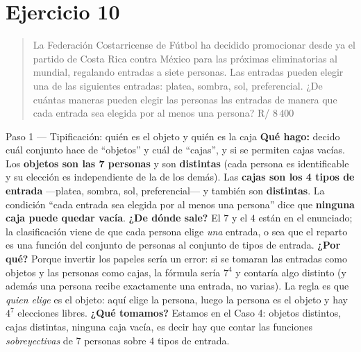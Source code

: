 \documentclass[11pt]{article}
\begin{document}
\section*{Ejercicio 10}

\begin{quote}
La Federación Costarricense de Fútbol ha decidido promocionar desde ya el partido de Costa Rica contra México para las próximas eliminatorias al mundial, regalando entradas a siete personas. Las entradas pueden elegir una de las siguientes entradas: platea, sombra, sol, preferencial. ¿De cuántas maneras pueden elegir las personas las entradas de manera que cada entrada sea elegida por al menos una persona? \hfill R/ $8\,400$
\end{quote}

\begin{paso}{Paso 1 --- Tipificación: quién es el objeto y quién es la caja}
\textbf{Qué hago:} decido cuál conjunto hace de ``objetos'' y cuál de ``cajas'', y si se permiten cajas vacías.
Los \textbf{objetos son las 7 personas} y son \textbf{distintas} (cada persona es identificable y su elección es independiente de la de los demás). Las \textbf{cajas son los 4 tipos de entrada} —platea, sombra, sol, preferencial— y también son \textbf{distintas}. La condición ``cada entrada sea elegida por al menos una persona'' dice que \textbf{ninguna caja puede quedar vacía}.
\textbf{¿De dónde sale?} El $7$ y el $4$ están en el enunciado; la clasificación viene de que cada persona elige \emph{una} entrada, o sea que el reparto es una función del conjunto de personas al conjunto de tipos de entrada.
\textbf{¿Por qué?} Porque invertir los papeles sería un error: si se tomaran las entradas como objetos y las personas como cajas, la fórmula sería $7^4$ y contaría algo distinto (y además una persona recibe exactamente una entrada, no varias). La regla es que \emph{quien elige} es el objeto: aquí elige la persona, luego la persona es el objeto y hay $4^7$ elecciones libres.
\textbf{¿Qué tomamos?} Estamos en el Caso 4: objetos distintos, cajas distintas, ninguna caja vacía, es decir hay que contar las funciones \emph{sobreyectivas} de $7$ personas sobre $4$ tipos de entrada.
\end{paso}
\end{document}

